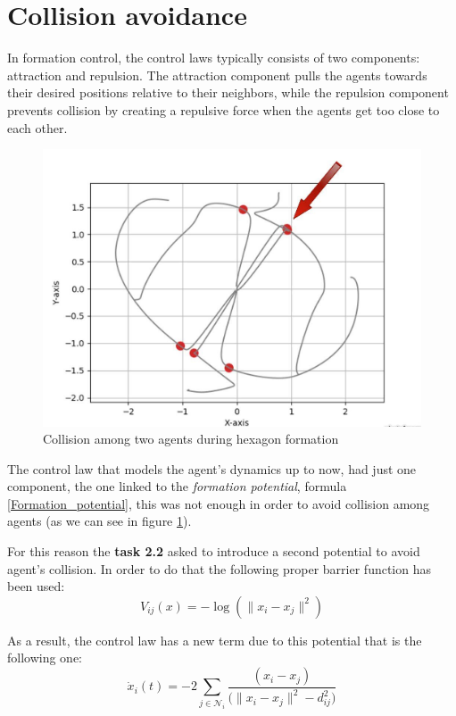\documentclass[a4paper,11pt,oneside]{book}
\begin{document}
\section{Collision avoidance}
In formation control, the control laws typically consists of two components: attraction and repulsion. The attraction component pulls the agents towards their desired positions relative to their neighbors, while the repulsion component prevents collision by creating a repulsive force when the agents get too close to each other.

\begin{figure}[h]
\centering
	\includegraphics[scale=0.25]{Collision}
	\caption{Collision among two agents during hexagon formation}
	\label{Collision}
\end{figure}

The control law that models the agent's dynamics up to now, had just one component, the one linked to the \textit{formation potential}, formula \ref{Formation_potential}, this was not enough in order to avoid collision among agents (as we can see in figure \ref{Collision}). 

\bigskip
For this reason the \textbf{task 2.2} asked to introduce a second potential to avoid agent's collision. In order to do that the following proper barrier function has been used:
\begin{equation}
V_{ij}(x) = - \log( \lVert x_i - x_j \rVert ^2)
\label{Collision_barrier}
\end{equation}


As a result, the control law has a new term due to this potential that is the following one:
\begin{equation}
\dot{x}_i(t) = - 2\sum_{j \in \mathcal{N}_i} \frac{(x_i-x_j)}{\bigg( \lVert x_i - x_j \rVert^2 - d_{ij}^2 \bigg)}
\end{equation}
\end{document}
